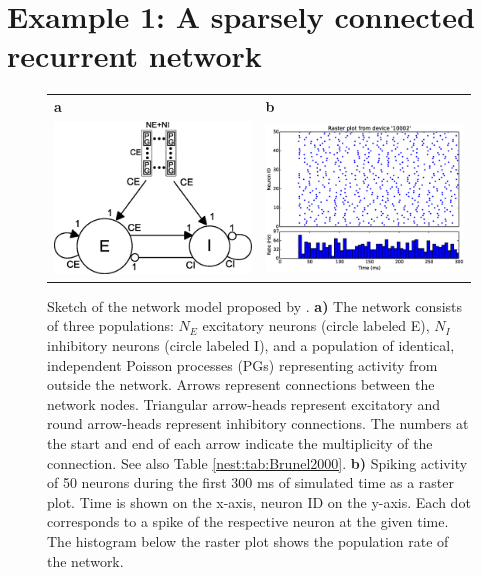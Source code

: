 \documentclass{article}
\begin{document}
\section{Example 1: A sparsely connected recurrent network}
\label{nest:sec:brunel}
\begin{figure}[!htb]
\centering
\begin{tabular}{ll}
\textbf{a} & \textbf{b}\\
\includegraphics[width=0.4\linewidth]{figures/brunel_detailed_external_single2.eps}&
\includegraphics[width=0.5\linewidth]{figures/brunel_interactive.eps}
\end{tabular}

\caption{\label{nest:fig:brunel2000} Sketch of the network model
  proposed by \citet{Brunel00}. \textbf{a)} The network consists of
  three populations: $N_E$ excitatory neurons (circle labeled E), $N_I$
  inhibitory neurons (circle labeled I), and a
  population of identical, independent Poisson processes (PGs) representing
  activity from outside the network. Arrows represent connections
  between the network nodes. Triangular arrow-heads represent
  excitatory and round arrow-heads represent inhibitory
  connections. The numbers at the start and end of each arrow indicate
  the multiplicity of the connection. See also Table
  \ref{nest:tab:Brunel2000}. \textbf{b)} Spiking activity of 50 neurons
  during the first 300 ms of simulated time as a raster plot. Time is
  shown on the x-axis, neuron ID on the y-axis. Each dot corresponds
  to a spike of the respective neuron at the given time. The histogram
  below the raster plot shows the population rate of the network.}
\end{figure}
\end{document}

